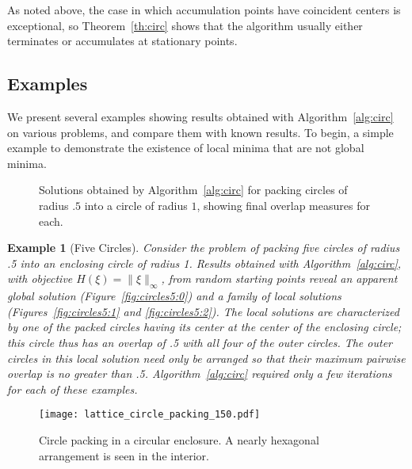 \documentclass{siamltex}
\newtheorem{Exa}{Example}[section]
\begin{document}
As noted above, the case in which accumulation points have coincident
centers is exceptional, so Theorem~\ref{th:circ} shows that the
algorithm usually either terminates or accumulates at stationary
points.

 

\subsection{Examples} \label{sec:sphere:examples}

We present several examples showing results obtained with
Algorithm~\ref{alg:circ} on various problems, and compare them with
known results. To begin, a simple example to demonstrate the
existence of local minima that are not global minima.

\begin{figure}[!t]
\centering
{} \;
 \;
\label{fig:circles5}
\caption{Solutions obtained by Algorithm~\ref{alg:circ} for packing
  circles of radius $.5$ into a circle of radius $1$, showing final
  overlap measures for each.}
\end{figure}

\begin{Exa}[Five Circles]
  Consider the problem of packing five circles of radius .5 into an
  enclosing circle of radius 1. Results obtained with
  Algorithm~\ref{alg:circ}, with objective $H(\xi) =
  \|\xi\|_{\infty}$, from random starting points reveal an apparent
  global solution (Figure~\ref{fig:circles5:0}) and a family of local
  solutions (Figures~\ref{fig:circles5:1} and
  \ref{fig:circles5:2}). The local solutions are characterized by one
  of the packed circles having its center at the center of the
  enclosing circle; this circle thus has an overlap of .5 with all
  four of the outer circles. The outer circles in this local solution
  need only be arranged so that their maximum pairwise overlap is no
  greater than .5. Algorithm~\ref{alg:circ} required only a few
  iterations for each of these examples.
\end{Exa}

\begin{figure}[!t]
\centering
\texttt{[image: lattice\_circle\_packing\_150.pdf]} 
\caption{Circle packing in a circular enclosure. A nearly hexagonal
  arrangement is seen in the interior.}
\label{fig:circle_packing_circle}
\end{figure}
\end{document}
